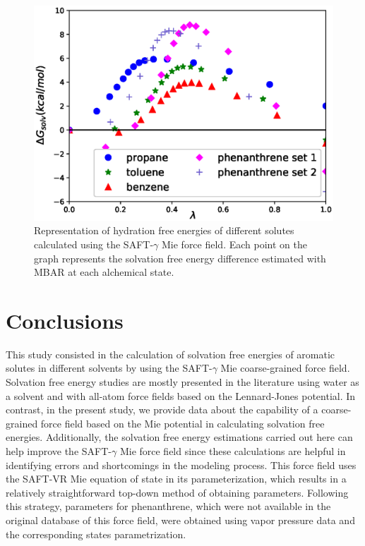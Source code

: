 \documentclass[preprint]{elsarticle}
\begin{document}
	\begin{figure}
		\centering
		\includegraphics[width=1.0\linewidth]{Figures/waterartsets.eps}
		\caption{Representation of hydration free energies of different solutes calculated using the SAFT-$\gamma$ Mie force field. Each point on the graph represents the solvation free energy difference estimated with MBAR at each alchemical state.}
		\label{fig:water}
	\end{figure}
	
	\section{Conclusions}

	This study consisted in the calculation of solvation free energies of aromatic solutes in different solvents by using the SAFT-$\gamma$ Mie coarse-grained force field. Solvation free energy studies are mostly presented in the literature using water as a solvent and with all-atom force fields based on the Lennard-Jones potential. In contrast, in the present study, we provide data about the capability of a coarse-grained force field based on the Mie potential in calculating solvation free energies. Additionally, the solvation free energy estimations carried out here can help improve the SAFT-$\gamma$ Mie force field since these calculations are helpful in identifying errors and shortcomings in the modeling process. This force field uses the SAFT-VR Mie equation of state in its parameterization, which results in a relatively straightforward top-down method of obtaining parameters. Following this strategy, parameters for phenanthrene, which were not available in the original database of this force field, were obtained using vapor pressure data and the corresponding states parametrization.
\end{document}
